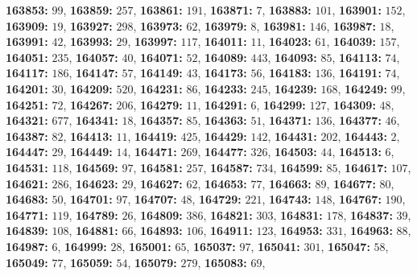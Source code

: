 \textsf{\bfseries 163853:} $99$, \textsf{\bfseries 163859:} $257$, \textsf{\bfseries 163861:} $191$, \textsf{\bfseries 163871:} $7$, \textsf{\bfseries 163883:} $101$, \textsf{\bfseries 163901:} $152$, \textsf{\bfseries 163909:} $19$, \textsf{\bfseries 163927:} $298$, \textsf{\bfseries 163973:} $62$, \textsf{\bfseries 163979:} $8$, \textsf{\bfseries 163981:} $146$, \textsf{\bfseries 163987:} $18$, \textsf{\bfseries 163991:} $42$, \textsf{\bfseries 163993:} $29$, \textsf{\bfseries 163997:} $117$, \textsf{\bfseries 164011:} $11$, \textsf{\bfseries 164023:} $61$, \textsf{\bfseries 164039:} $157$, \textsf{\bfseries 164051:} $235$, \textsf{\bfseries 164057:} $40$, \textsf{\bfseries 164071:} $52$, \textsf{\bfseries 164089:} $443$, \textsf{\bfseries 164093:} $85$, \textsf{\bfseries 164113:} $74$, \textsf{\bfseries 164117:} $186$, \textsf{\bfseries 164147:} $57$, \textsf{\bfseries 164149:} $43$, \textsf{\bfseries 164173:} $56$, \textsf{\bfseries 164183:} $136$, \textsf{\bfseries 164191:} $74$, \textsf{\bfseries 164201:} $30$, \textsf{\bfseries 164209:} $520$, \textsf{\bfseries 164231:} $86$, \textsf{\bfseries 164233:} $245$, \textsf{\bfseries 164239:} $168$, \textsf{\bfseries 164249:} $99$, \textsf{\bfseries 164251:} $72$, \textsf{\bfseries 164267:} $206$, \textsf{\bfseries 164279:} $11$, \textsf{\bfseries 164291:} $6$, \textsf{\bfseries 164299:} $127$, \textsf{\bfseries 164309:} $48$, \textsf{\bfseries 164321:} $677$, \textsf{\bfseries 164341:} $18$, \textsf{\bfseries 164357:} $85$, \textsf{\bfseries 164363:} $51$, \textsf{\bfseries 164371:} $136$, \textsf{\bfseries 164377:} $46$, \textsf{\bfseries 164387:} $82$, \textsf{\bfseries 164413:} $11$, \textsf{\bfseries 164419:} $425$, \textsf{\bfseries 164429:} $142$, \textsf{\bfseries 164431:} $202$, \textsf{\bfseries 164443:} $2$, \textsf{\bfseries 164447:} $29$, \textsf{\bfseries 164449:} $14$, \textsf{\bfseries 164471:} $269$, \textsf{\bfseries 164477:} $326$, \textsf{\bfseries 164503:} $44$, \textsf{\bfseries 164513:} $6$, \textsf{\bfseries 164531:} $118$, \textsf{\bfseries 164569:} $97$, \textsf{\bfseries 164581:} $257$, \textsf{\bfseries 164587:} $734$, \textsf{\bfseries 164599:} $85$, \textsf{\bfseries 164617:} $107$, \textsf{\bfseries 164621:} $286$, \textsf{\bfseries 164623:} $29$, \textsf{\bfseries 164627:} $62$, \textsf{\bfseries 164653:} $77$, \textsf{\bfseries 164663:} $89$, \textsf{\bfseries 164677:} $80$, \textsf{\bfseries 164683:} $50$, \textsf{\bfseries 164701:} $97$, \textsf{\bfseries 164707:} $48$, \textsf{\bfseries 164729:} $221$, \textsf{\bfseries 164743:} $148$, \textsf{\bfseries 164767:} $190$, \textsf{\bfseries 164771:} $119$, \textsf{\bfseries 164789:} $26$, \textsf{\bfseries 164809:} $386$, \textsf{\bfseries 164821:} $303$, \textsf{\bfseries 164831:} $178$, \textsf{\bfseries 164837:} $39$, \textsf{\bfseries 164839:} $108$, \textsf{\bfseries 164881:} $66$, \textsf{\bfseries 164893:} $106$, \textsf{\bfseries 164911:} $123$, \textsf{\bfseries 164953:} $331$, \textsf{\bfseries 164963:} $88$, \textsf{\bfseries 164987:} $6$, \textsf{\bfseries 164999:} $28$, \textsf{\bfseries 165001:} $65$, \textsf{\bfseries 165037:} $97$, \textsf{\bfseries 165041:} $301$, \textsf{\bfseries 165047:} $58$, \textsf{\bfseries 165049:} $77$, \textsf{\bfseries 165059:} $54$, \textsf{\bfseries 165079:} $279$, \textsf{\bfseries 165083:} $69$, 
